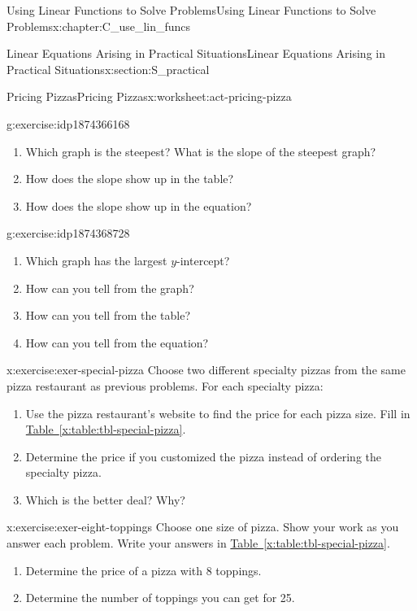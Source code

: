 \documentclass[oneside,10pt,]{book}
\newcommand{\xreffont}{\relax}
\numberwithin{equation}{chapter}
\begin{document}
\begin{chapterptx}{Using Linear Functions to Solve Problems}{}{Using Linear Functions to Solve Problems}{}{}{x:chapter:C_use_lin_funcs}
\begin{sectionptx}{Linear Equations Arising in Practical Situations}{}{Linear Equations Arising in Practical Situations}{}{}{x:section:S_practical}
\begin{worksheet-subsection}{Pricing Pizzas}{}{Pricing Pizzas}{}{}{x:worksheet:act-pricing-pizza}
\begin{divisionexercise}{5}{}{}{g:exercise:idp1874366168}
\begin{enumerate}[font=\bfseries,label=(\alph*),ref=\alph*]
\item{}Which graph is the steepest? What is the slope of the steepest graph?%
\item{}How does the slope show up in the table?%
\item{}How does the slope show up in the equation?%
\end{enumerate}
\end{divisionexercise}%
\begin{divisionexercise}{6}{}{}{g:exercise:idp1874368728}%
\begin{enumerate}[font=\bfseries,label=(\alph*),ref=\alph*]
\item{}Which graph has the largest \(y\)-intercept?%
\item{}How can you tell from the graph?%
\item{}How can you tell from the table?%
\item{}How can you tell from the equation?%
\end{enumerate}
\end{divisionexercise}%
\begin{divisionexercise}{7}{}{}{x:exercise:exer-special-pizza}%
Choose two different specialty pizzas from the same pizza restaurant as previous problems. For each specialty pizza:%
\begin{enumerate}[font=\bfseries,label=(\alph*),ref=\alph*]
\item{}Use the pizza restaurant's website to find the price for each pizza size. Fill in \hyperref[x:table:tbl-special-pizza]{Table~{\xreffont\ref{x:table:tbl-special-pizza}}}.%
\item{}Determine the price if you customized the pizza instead of ordering the specialty pizza.%
\item{}Which is the better deal? Why?%
\end{enumerate}
\end{divisionexercise}%
\begin{divisionexercise}{8}{}{}{x:exercise:exer-eight-toppings}%
Choose one size of pizza. Show your work as you answer each problem. Write your answers in \hyperref[x:table:tbl-special-pizza]{Table~{\xreffont\ref{x:table:tbl-special-pizza}}}.%
\begin{enumerate}[font=\bfseries,label=(\alph*),ref=\alph*]
\item{}Determine the price of a pizza with 8 toppings.%
\item{}Determine the number of toppings you can get for \textdollar{}25.%
\end{enumerate}

\end{divisionexercise}
\end{worksheet-subsection}
\end{sectionptx}
\end{chapterptx}
\end{document}
